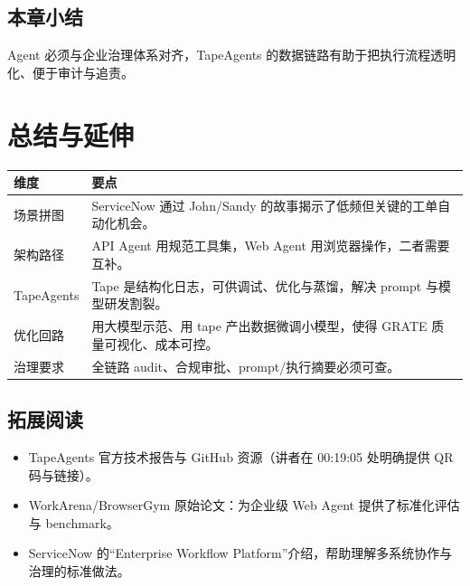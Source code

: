 \documentclass[a4paper]{article}
\begin{document}
\subsection{本章小结}
Agent 必须与企业治理体系对齐，TapeAgents 的数据链路有助于把执行流程透明化、便于审计与追责。

\section{总结与延伸}
\begin{tabular}{@{}p{4.5cm}p{11cm}@{}}
\toprule
维度 & 要点 \\
\midrule
场景拼图 & ServiceNow 通过 John/Sandy 的故事揭示了低频但关键的工单自动化机会。 \\
架构路径 & API Agent 用规范工具集，Web Agent 用浏览器操作，二者需要互补。 \\
TapeAgents & Tape 是结构化日志，可供调试、优化与蒸馏，解决 prompt 与模型研发割裂。 \\
优化回路 & 用大模型示范、用 tape 产出数据微调小模型，使得 GRATE 质量可视化、成本可控。 \\
治理要求 & 全链路 audit、合规审批、prompt/执行摘要必须可查。 \\
\bottomrule
\end{tabular}

\subsection{拓展阅读}
\begin{itemize}
    \item TapeAgents 官方技术报告与 GitHub 资源（讲者在 00:19:05 处明确提供 QR 码与链接）。\newline
    \item WorkArena/BrowserGym 原始论文：为企业级 Web Agent 提供了标准化评估与 benchmark。
    \item ServiceNow 的“Enterprise Workflow Platform”介绍，帮助理解多系统协作与治理的标准做法。
\end{itemize}
\end{document}
